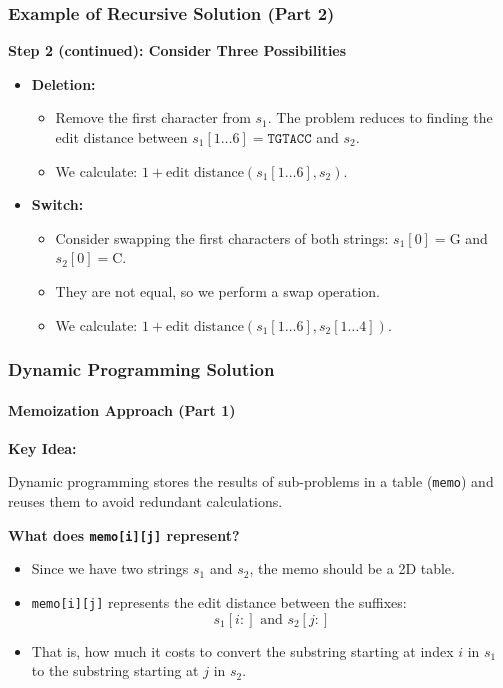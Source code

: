 \documentclass[10pt,aspectratio=43]{beamer}
\begin{document}
\begin{frame}
    \frametitle{Example of Recursive Solution (Part 2)}

    \textbf{Step 2 (continued): Consider Three Possibilities}
    
    \begin{itemize}
        \item \textbf{Deletion:} 
        \begin{itemize}
            \item Remove the first character from $s_1$. The problem reduces to finding the edit distance between $s_1[1 \ldots 6] = \texttt{TGTACC}$ and $s_2$.
            \item We calculate: $1 + \text{edit distance}(s_1[1 \ldots 6], s_2)$.
        \end{itemize}

        \vspace{0.3cm}

        \item \textbf{Switch:}
        \begin{itemize}
            \item Consider swapping the first characters of both strings: $s_1[0] = \text{G}$ and $s_2[0] = \text{C}$.
            \item They are not equal, so we perform a swap operation.
            \item We calculate: $1 + \text{edit distance}(s_1[1 \ldots 6], s_2[1 \ldots 4])$.
        \end{itemize}
    \end{itemize}
\end{frame}


\begin{frame}
    \frametitle{Dynamic Programming Solution}
    \framesubtitle{Memoization Approach (Part 1)}

    \textbf{Key Idea:}
    
    \vspace{0.2cm}
    Dynamic programming stores the results of sub-problems in a table (\texttt{memo}) and reuses them to avoid redundant calculations.

    \vspace{0.3cm}

    \textbf{What does \texttt{memo[i][j]} represent?}
    \begin{itemize}
        \item Since we have two strings $s_1$ and $s_2$, the memo should be a 2D table.
        \item \texttt{memo[i][j]} represents the edit distance between the suffixes:
        \[
        s_1[i:] \text{ and } s_2[j:]
        \]
        \item That is, how much it costs to convert the substring starting at index $i$ in $s_1$ to the substring starting at $j$ in $s_2$.
    \end{itemize}
\end{frame}
\end{document}
